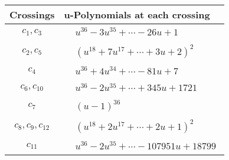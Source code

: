 \documentclass[1p]{elsarticle_modified}
\theoremstyle{definition}
\begin{document}
\begin{tabular}{m{50pt}|m{274pt}}
Crossings & \hspace{64pt}u-Polynomials at each crossing \\
\hline $$\begin{aligned}c_{1},c_{3}\end{aligned}$$&$\begin{aligned}
&u^{36}-3 u^{35}+\cdots-26 u+1
\end{aligned}$\\
\hline $$\begin{aligned}c_{2},c_{5}\end{aligned}$$&$\begin{aligned}
&(u^{18}+7 u^{17}+\cdots+3 u+2)^{2}
\end{aligned}$\\
\hline $$\begin{aligned}c_{4}\end{aligned}$$&$\begin{aligned}
&u^{36}+4 u^{34}+\cdots-81 u+7
\end{aligned}$\\
\hline $$\begin{aligned}c_{6},c_{10}\end{aligned}$$&$\begin{aligned}
&u^{36}-2 u^{35}+\cdots+345 u+1721
\end{aligned}$\\
\hline $$\begin{aligned}c_{7}\end{aligned}$$&$\begin{aligned}
&(u-1)^{36}
\end{aligned}$\\
\hline $$\begin{aligned}c_{8},c_{9},c_{12}\end{aligned}$$&$\begin{aligned}
&(u^{18}+2 u^{17}+\cdots+2 u+1)^{2}
\end{aligned}$\\
\hline $$\begin{aligned}c_{11}\end{aligned}$$&$\begin{aligned}
&u^{36}-2 u^{35}+\cdots-107951 u+18799
\end{aligned}$\\
\hline
\end{tabular}\\~\\
\newpage\renewcommand{\arraystretch}{1}
\end{document}
